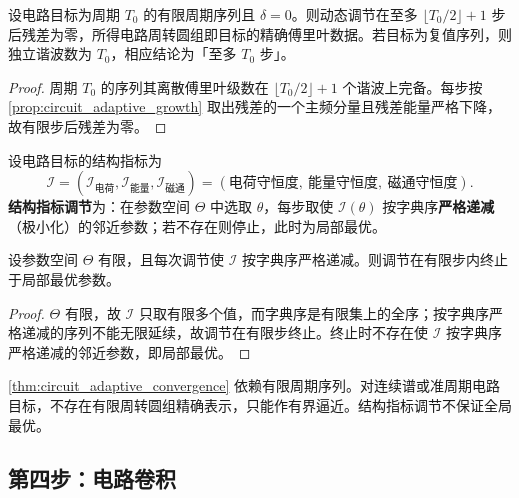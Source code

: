 \begin{theorem}[动态调节的收敛性]\label{thm:circuit_adaptive_convergence}
设电路目标为周期 $T_0$ 的有限周期序列且 $\delta=0$。则动态调节在至多 $\lfloor T_0/2\rfloor+1$ 步后残差为零，所得电路周转圆组即目标的精确傅里叶数据。若目标为复值序列，则独立谐波数为 $T_0$，相应结论为「至多 $T_0$ 步」。
\end{theorem}

\begin{proof}
周期 $T_0$ 的序列其离散傅里叶级数在 $\lfloor T_0/2\rfloor+1$ 个谐波上完备。每步按 \cref{prop:circuit_adaptive_growth} 取出残差的一个主频分量且残差能量严格下降，故有限步后残差为零。
\end{proof}

\begin{definition}[结构指标调节]\label{def:circuit_structure_metric_adjustment}
设电路目标的结构指标为
\[
\mathcal I=(\mathcal I_{\text{电荷}},\mathcal I_{\text{能量}},\mathcal I_{\text{磁通}})
=(\text{电荷守恒度},\ \text{能量守恒度},\ \text{磁通守恒度}).
\]
\textbf{结构指标调节}为：在参数空间 $\Theta$ 中选取 $\theta$，每步取使 $\mathcal I(\theta)$ 按字典序\textbf{严格递减}（极小化）的邻近参数；若不存在则停止，此时为局部最优。
\end{definition}

\begin{proposition}[结构指标调节的有限收敛]\label{prop:circuit_structure_metric_convergence}
设参数空间 $\Theta$ 有限，且每次调节使 $\mathcal I$ 按字典序严格递减。则调节在有限步内终止于局部最优参数。
\end{proposition}

\begin{proof}
$\Theta$ 有限，故 $\mathcal I$ 只取有限多个值，而字典序是有限集上的全序；按字典序严格递减的序列不能无限延续，故调节在有限步终止。终止时不存在使 $\mathcal I$ 按字典序严格递减的邻近参数，即局部最优。
\end{proof}

\begin{remark}[动态调节的边界]\label{rem:circuit_adaptive_boundary}
\cref{thm:circuit_adaptive_convergence} 依赖有限周期序列。对连续谱或准周期电路目标，不存在有限周转圆组精确表示，只能作有界逼近。结构指标调节不保证全局最优。
\end{remark}

\subsection{第四步：电路卷积}

